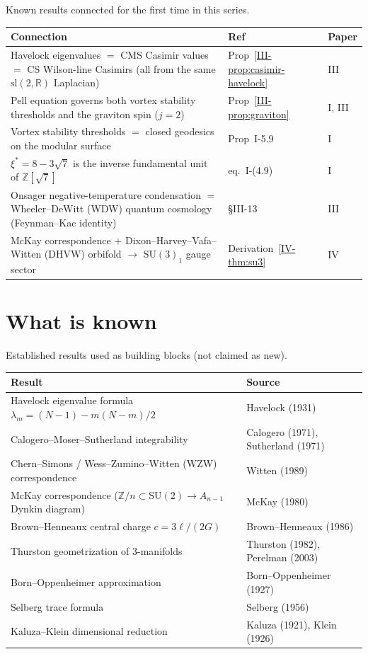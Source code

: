 Known results connected for the first time in this series.

\medskip
\begin{tabular}{p{6.5cm}lp{4cm}}
\toprule
Connection & Ref & Paper \\
\midrule
Havelock eigenvalues $=$ CMS Casimir values
  $=$ CS Wilson-line Casimirs (all from the
  same $\mathrm{sl}(2,\mathbb{R})$ Laplacian) &
  Prop~\ref*{III-prop:casimir-havelock} & III \\[4pt]
Pell equation governs both vortex stability
  thresholds and the graviton spin ($j = 2$) &
  Prop~\ref*{III-prop:graviton} & I, III \\[4pt]
Vortex stability thresholds $=$ closed
  geodesics on the modular surface &
  Prop~I-5.9 & I \\[4pt]
$\xi^* = 8 - 3\sqrt{7}$ is the inverse
  fundamental unit of $\mathbb{Z}[\sqrt{7}]$ &
  eq.~I-(4.9) & I \\[4pt]
Onsager negative-temperature condensation
  $=$ Wheeler--DeWitt (WDW) quantum cosmology
  (Feynman--Kac identity) &
  \S III-13 & III \\[4pt]
McKay correspondence $+$
  Dixon--Harvey--Vafa--Witten (DHVW) orbifold
  $\to$ $\mathrm{SU}(3)_1$ gauge sector &
  Derivation~\ref*{IV-thm:su3} & IV \\[4pt]
\bottomrule
\end{tabular}


\section{What is known}

Established results used as building blocks (not claimed as new).

\medskip
\begin{tabular}{p{6.5cm}p{6.5cm}}
\toprule
Result & Source \\
\midrule
Havelock eigenvalue formula $\lambda_m = (N{-}1) - m(N{-}m)/2$ &
  Havelock (1931) \\[3pt]
Calogero--Moser--Sutherland integrability &
  Calogero (1971), Sutherland (1971) \\[3pt]
Chern--Simons / Wess--Zumino--Witten (WZW) correspondence &
  Witten (1989) \\[3pt]
McKay correspondence ($\mathbb{Z}/n \subset \mathrm{SU}(2)
  \to A_{n-1}$ Dynkin diagram) &
  McKay (1980) \\[3pt]
Brown--Henneaux central charge $c = 3\ell/(2G)$ &
  Brown--Henneaux (1986) \\[3pt]
Thurston geometrization of 3-manifolds &
  Thurston (1982), Perelman (2003) \\[3pt]
Born--Oppenheimer approximation &
  Born--Oppenheimer (1927) \\[3pt]
Selberg trace formula &
  Selberg (1956) \\[3pt]
Kaluza--Klein dimensional reduction &
  Kaluza (1921), Klein (1926) \\[3pt]
\bottomrule
\end{tabular}


